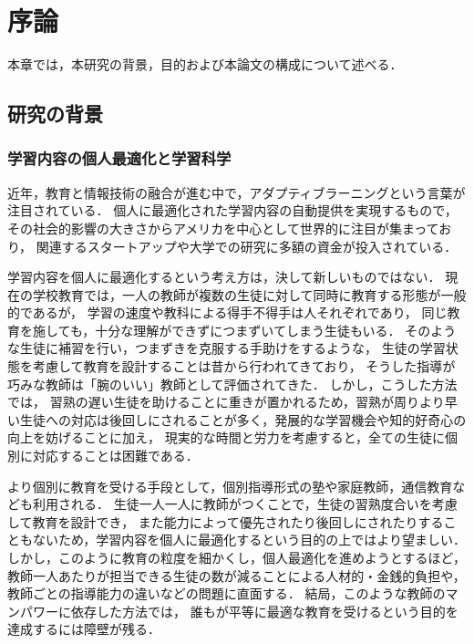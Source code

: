 \chapter{序論}
\label{chap:intro}
\fancyhf{}
\rhead{\thepage}
\cfoot{\thepage}

本章では，本研究の背景，目的および本論文の構成について述べる．


\section{研究の背景}

\subsection{学習内容の個人最適化と学習科学}
近年，教育と情報技術の融合が進む中で，アダプティブラーニングという言葉が注目されている．
個人に最適化された学習内容の自動提供を実現するもので，その社会的影響の大きさからアメリカを中心として世界的に注目が集まっており，
関連するスタートアップや大学での研究に多額の資金が投入されている\cite{piccioli2014learning}．

学習内容を個人に最適化するという考え方は，決して新しいものではない．
現在の学校教育では，一人の教師が複数の生徒に対して同時に教育する形態が一般的であるが，
学習の速度や教科による得手不得手は人それぞれであり，
同じ教育を施しても，十分な理解ができずにつまずいてしまう生徒もいる．
そのような生徒に補習を行い，つまずきを克服する手助けをするような，
生徒の学習状態を考慮して教育を設計することは昔から行われてきており，
そうした指導が巧みな教師は「腕のいい」教師として評価されてきた．
しかし，こうした方法では，
習熟の遅い生徒を助けることに重きが置かれるため，習熟が周りより早い生徒への対応は後回しにされることが多く，発展的な学習機会や知的好奇心の向上を妨げることに加え，
現実的な時間と労力を考慮すると，全ての生徒に個別に対応することは困難である．

より個別に教育を受ける手段として，個別指導形式の塾や家庭教師，通信教育なども利用される．
生徒一人一人に教師がつくことで，生徒の習熟度合いを考慮して教育を設計でき，
また能力によって優先されたり後回しにされたりすることもないため，学習内容を個人に最適化するという目的の上ではより望ましい．
しかし，このように教育の粒度を細かくし，個人最適化を進めようとするほど，
教師一人あたりが担当できる生徒の数が減ることによる人材的・金銭的負担や，教師ごとの指導能力の違いなどの問題に直面する．
結局，このような教師のマンパワーに依存した方法では，
誰もが平等に最適な教育を受けるという目的を達成するには障壁が残る．

